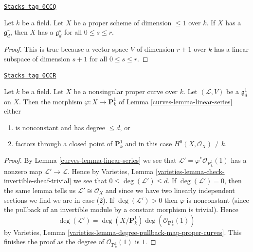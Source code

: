 \begin{lemma}
\label{curves-lemma-linear-series-trivial-existence}
\href{https://stacks.math.columbia.edu/tag/0CCQ}{\texttt{Stacks tag 0CCQ}}

Let $k$ be a field. Let $X$ be a proper scheme of dimension $\leq 1$ over $k$.
If $X$ has a $\mathfrak g^r_d$, then $X$ has a $\mathfrak g^s_d$ for
all $0 \leq s \leq r$.
\end{lemma}

\begin{proof}
This is true because a vector space $V$ of dimension $r + 1$
over $k$ has a linear subspace of dimension $s + 1$ for all
$0 \leq s \leq r$.
\end{proof}

\begin{lemma}[G1d]
\label{curves-lemma-g1d}
\href{https://stacks.math.columbia.edu/tag/0CCR}{\texttt{Stacks tag 0CCR}}

Let $k$ be a field. Let $X$ be a nonsingular proper curve over $k$.
Let $(\mathcal{L}, V)$ be a $\mathfrak g^1_d$ on $X$. Then the morphism
$\varphi : X \to \mathbf{P}^1_k$ of Lemma \ref{curves-lemma-linear-series}
either
\begin{enumerate}
\item is nonconstant and has degree $\leq d$, or
\item factors through a closed point of $\mathbf{P}^1_k$ and in this
case $H^0(X, \mathcal{O}_X) \not = k$.
\end{enumerate}
\end{lemma}

\begin{proof}

By Lemma \ref{curves-lemma-linear-series} we see that
$\mathcal{L}' = \varphi^*\mathcal{O}_{\mathbf{P}^1_k}(1)$
has a nonzero map $\mathcal{L}' \to \mathcal{L}$.
Hence by Varieties, Lemma \ref{varieties-lemma-check-invertible-sheaf-trivial}
we see that $0 \leq \deg(\mathcal{L}') \leq d$.
If $\deg(\mathcal{L}') = 0$, then the same lemma tells us
$\mathcal{L}' \cong \mathcal{O}_X$ and since we have
two linearly independent sections we find we are in case (2).
If $\deg(\mathcal{L}') > 0$ then $\varphi$ is nonconstant (since the
pullback of an invertible module by a constant morphism is trivial).
Hence
$$
\deg(\mathcal{L}') =
\deg(X/\mathbf{P}^1_k) \deg(\mathcal{O}_{\mathbf{P}^1_k}(1))
$$
by Varieties, Lemma \ref{varieties-lemma-degree-pullback-map-proper-curves}.
This finishes the proof as the degree of
$\mathcal{O}_{\mathbf{P}^1_k}(1)$ is $1$.
\end{proof}

